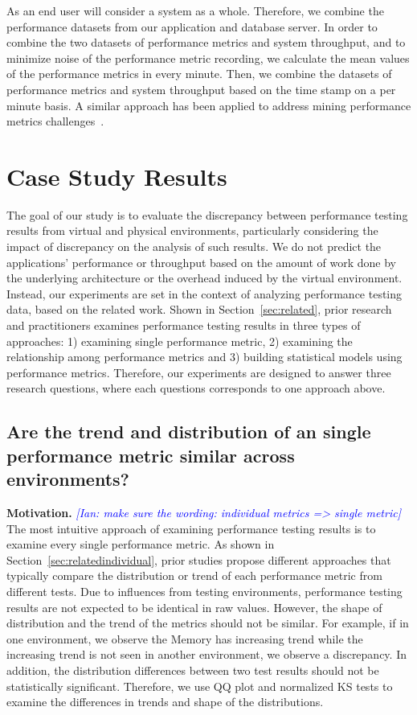 \documentclass[smallextended]{svjour3}       %
\newcommand{\ian}[1]{\textcolor{blue}{{\it [Ian: #1]}}}
\begin{document}
As an end user will consider a system as a whole. Therefore, we combine the performance datasets from our application and database server. In order to combine the two datasets of performance metrics and system throughput, and to minimize noise of the performance metric recording, we calculate the mean values of the performance metrics in every minute. Then, we combine the datasets of performance metrics and system throughput based on the time stamp on a per minute basis. A similar approach has been applied to address mining performance metrics challenges~\cite{foo2010mining}.



\section{Case Study Results}
\label{sec:results}

The goal of our study is to evaluate the discrepancy between performance testing results from virtual and physical environments, particularly considering the impact of discrepancy on the analysis of such results. We do not predict the applications' performance or throughput based on the amount of work done by the underlying architecture or the overhead induced by the virtual environment. Instead, our experiments are set in the context of analyzing performance testing data, based on the related work. Shown in Section~\ref{sec:related}, prior research and practitioners examines performance testing results in three types of approaches: 1) examining single performance metric, 2) examining the relationship among performance metrics and 3) building statistical models using performance metrics. Therefore, our experiments are designed to answer three research questions, where each questions corresponds to one approach above.



\subsection{Are the trend and distribution of an single performance metric similar across environments?}
\label{sec:individual}


\noindent \textbf{Motivation.}
\ian{make sure the wording: individual metrics => single metric}
The most intuitive approach of examining performance testing results is to examine every single performance metric. As shown in Section~\ref{sec:relatedindividual}, prior studies propose different approaches that typically compare the distribution or trend of each performance metric from different tests. Due to influences from testing environments, performance testing results are not expected to be identical in raw values. However, the shape of distribution and the trend of the metrics should not be similar. For example, if in one environment, we observe the Memory has increasing trend while the increasing trend is not seen in another environment, we observe a discrepancy. In addition, the distribution differences between two test results should not be statistically significant. Therefore, we use QQ plot and normalized KS tests to examine the differences in trends and shape of the distributions. 
\end{document}
